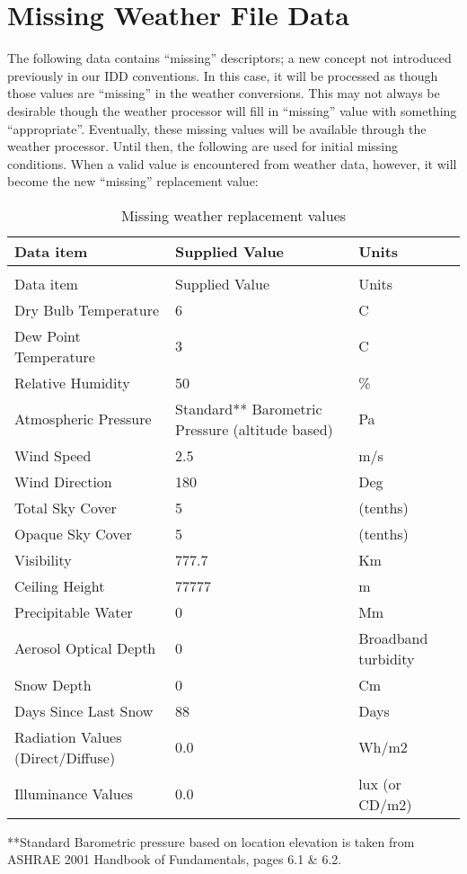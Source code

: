 \section{Missing Weather File Data}\label{missing-weather-file-data}

The following data contains ``missing'' descriptors; a new concept not introduced previously in our IDD conventions. In this case, it will be processed as though those values are ``missing'' in the weather conversions. This may not always be desirable though the weather processor will fill in ``missing'' value with something ``appropriate''. Eventually, these missing values will be available through the weather processor. Until then, the following are used for initial missing conditions. When a valid value is encountered from weather data, however, it will become the new ``missing'' replacement value:

\begin{longtable}[c]{p{1.83in}p{2.67in}p{1.5in}}
\caption{Missing weather replacement values \label{table:missing-weather-replacement-values}} \tabularnewline
\toprule 
Data item & Supplied Value & Units \tabularnewline
\midrule
\endfirsthead

\caption[]{Missing weather replacement values} \tabularnewline
\toprule 
Data item & Supplied Value & Units \tabularnewline
\midrule
\endhead

Dry Bulb Temperature & 6 & C \tabularnewline
Dew Point Temperature & 3 & C \tabularnewline
Relative Humidity & 50 & \% \tabularnewline
Atmospheric Pressure & Standard** Barometric Pressure (altitude based) & Pa \tabularnewline
Wind Speed & 2.5 & m/s \tabularnewline
Wind Direction & 180 & Deg \tabularnewline
Total Sky Cover & 5 & (tenths) \tabularnewline
Opaque Sky Cover & 5 & (tenths) \tabularnewline
Visibility & 777.7 & Km \tabularnewline
Ceiling Height & 77777 & m \tabularnewline
Precipitable Water & 0 & Mm \tabularnewline
Aerosol Optical Depth & 0 & Broadband turbidity \tabularnewline
Snow Depth & 0 & Cm \tabularnewline
Days Since Last Snow & 88 & Days \tabularnewline
Radiation Values (Direct/Diffuse) & 0.0 & Wh/m2 \tabularnewline
Illuminance Values & 0.0 & lux (or CD/m2) \tabularnewline
\bottomrule
\end{longtable}

**Standard Barometric pressure based on location elevation is taken from ASHRAE 2001 Handbook of Fundamentals, pages 6.1 \& 6.2.
